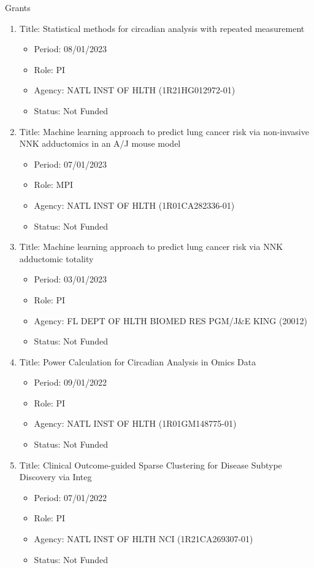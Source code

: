 \documentclass{resume} %
\begin{document}
\begin{rSection}{Grants}
\begin{enumerate}[noitemsep,topsep=0pt]
\item Title: Statistical methods for circadian analysis with repeated measurement
\begin{itemize}[noitemsep,topsep=0pt,leftmargin=*]
\item[] Period: 08/01/2023
\item[] Role: PI
\item[] Agency: NATL INST OF HLTH (1R21HG012972-01)
\item[] Status:  Not Funded
\end{itemize}

\item Title: Machine learning approach to predict lung cancer risk via non-invasive NNK adductomics in an A/J mouse model
\begin{itemize}[noitemsep,topsep=0pt,leftmargin=*]
\item[] Period: 07/01/2023
\item[] Role: MPI
\item[] Agency: NATL INST OF HLTH (1R01CA282336-01)
\item[] Status:  Not Funded
\end{itemize}

\item Title: Machine learning approach to predict lung cancer risk via NNK adductomic totality
\begin{itemize}[noitemsep,topsep=0pt,leftmargin=*]
\item[] Period: 03/01/2023
\item[] Role: PI
\item[] Agency: FL DEPT OF HLTH BIOMED RES PGM/J\&E KING (20012)
\item[] Status:  Not Funded
\end{itemize}

\item Title: Power Calculation for Circadian Analysis in Omics Data
\begin{itemize}[noitemsep,topsep=0pt,leftmargin=*]
\item[] Period: 09/01/2022
\item[] Role: PI
\item[] Agency: NATL INST OF HLTH (1R01GM148775-01)
\item[] Status:  Not Funded
\end{itemize}

\item Title: Clinical Outcome-guided Sparse Clustering for Disease Subtype Discovery via Integ
\begin{itemize}[noitemsep,topsep=0pt,leftmargin=*]
\item[] Period: 07/01/2022
\item[] Role: PI
\item[] Agency: NATL INST OF HLTH NCI (1R21CA269307-01)
\item[] Status:  Not Funded
\end{itemize}


\end{enumerate}
\end{rSection}
\end{document}
